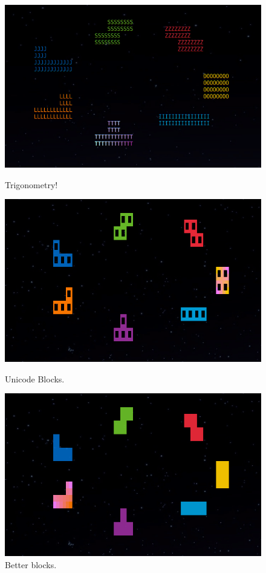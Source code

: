 \begin{figure}[!htbp]
  \centering
  \begin{minipage}{0.30\textwidth}
    \includegraphics[width=1\linewidth]{media/tetrimino-gradient3.png}
    \caption{Trigonometry!}
  \end{minipage}\hfill
  \begin{minipage}{0.30\textwidth}
    \includegraphics[width=1\linewidth]{media/tetrimino-gradient4.png}
    \caption{Unicode Blocks.}
  \end{minipage}\hfill
  \begin{minipage}{0.30\textwidth}
    \includegraphics[width=1\linewidth]{media/tetrimino-gradient5.png}
    \caption{Better blocks.}
  \end{minipage}\hfill
\end{figure}

